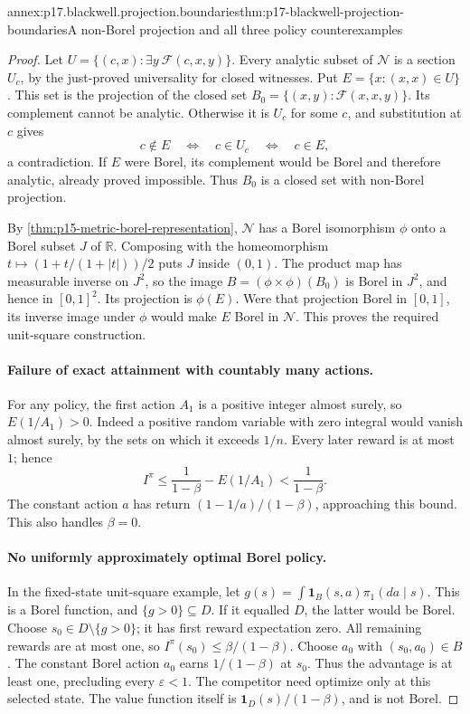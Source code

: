 \begin{annexitem}{annex:p17.blackwell.projection.boundaries}{thm:p17-blackwell-projection-boundaries}{A non-Borel projection and all three policy counterexamples}
\begin{proof}
Let \(U=\{(c,x):\exists y\ \mathcal F(c,x,y)\}\).
Every analytic subset of \(\mathcal N\) is a section
\(U_c\), by the just-proved universality for closed witnesses.
Put \(E=\{x:(x,x)\in U\}\). This set is the projection
of the closed set
\(B_0=\{(x,y):\mathcal F(x,x,y)\}\).
Its complement cannot be analytic. Otherwise it is \(U_c\)
for some \(c\), and substitution at \(c\) gives
\[
        c\notin E\quad\Longleftrightarrow\quad
        c\in U_c\quad\Longleftrightarrow\quad c\in E,
\]
a contradiction. If \(E\) were Borel, its complement would
be Borel and therefore analytic, already proved impossible.
Thus \(B_0\) is a closed set with non-Borel projection.

By \cref{thm:p15-metric-borel-representation},
\(\mathcal N\) has a Borel isomorphism \(\phi\) onto a
Borel subset \(J\) of \(\mathbb R\). Composing with the
homeomorphism
\(t\mapsto(1+t/(1+|t|))/2\) puts \(J\) inside \((0,1)\).
The product map has measurable inverse on \(J^2\), so the
image \(B=(\phi\times\phi)(B_0)\) is Borel in \(J^2\),
and hence in \([0,1]^2\). Its projection is \(\phi(E)\).
Were that projection Borel in \([0,1]\), its inverse image
under \(\phi\) would make \(E\) Borel in \(\mathcal N\).
This proves the required unit-square construction.

\paragraph{Failure of exact attainment with countably many actions.}
For any policy, the first action \(A_1\) is a positive integer
almost surely, so \(E(1/A_1)>0\). Indeed a positive random
variable with zero integral would vanish almost surely,
by the sets on which it exceeds \(1/n\).
Every later reward is at most \(1\); hence
\[
       I^\pi\leq\frac1{1-\beta}-E(1/A_1)
                         <\frac1{1-\beta}.
\]
The constant action \(a\) has return
\((1-1/a)/(1-\beta)\), approaching this bound.
This also handles \(\beta=0\).

\paragraph{No uniformly approximately optimal Borel policy.}
In the fixed-state unit-square example, let
\(g(s)=\int\mathbf1_B(s,a)\pi_1(da\mid s)\).
This is a Borel function, and \(\{g>0\}\subseteq D\).
If it equalled \(D\), the latter would be Borel.
Choose \(s_0\in D\setminus\{g>0\}\); it has first reward
expectation zero. All remaining rewards are at most one,
so \(I^\pi(s_0)\leq\beta/(1-\beta)\).
Choose \(a_0\) with \((s_0,a_0)\in B\).
The constant Borel action \(a_0\) earns
\(1/(1-\beta)\) at \(s_0\). Thus the advantage is at least
one, precluding every \(\varepsilon<1\).
The competitor need optimize only at this selected state.
The value function itself is
\(\mathbf1_D(s)/(1-\beta)\), and is not Borel.


\end{proof}
\end{annexitem}
